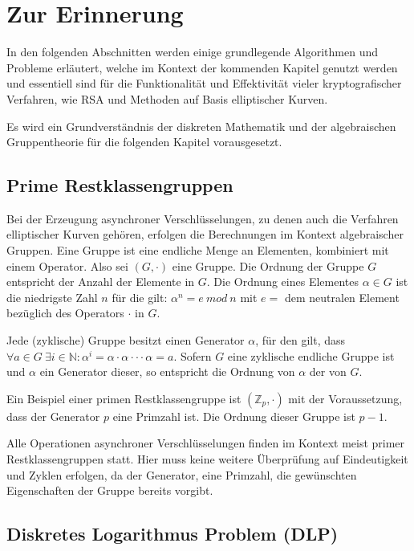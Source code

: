 \chapter{Zur Erinnerung}

In den folgenden Abschnitten werden einige grundlegende Algorithmen und Probleme erläutert, welche im Kontext der kommenden 
Kapitel genutzt werden und essentiell sind für die Funktionalität und Effektivität vieler kryptografischer Verfahren, wie RSA und Methoden 
auf Basis elliptischer Kurven.

Es wird ein Grundverständnis der diskreten Mathematik und der algebraischen Gruppentheorie für die folgenden Kapitel vorausgesetzt.

\section{Prime Restklassengruppen}

Bei der Erzeugung asynchroner Verschlüsselungen, zu denen auch die Verfahren elliptischer Kurven gehören, 
erfolgen die Berechnungen im Kontext algebraischer Gruppen.
Eine Gruppe ist eine endliche Menge an Elementen, kombiniert mit einem Operator. Also sei $(G,\cdotp)$ eine Gruppe.
Die Ordnung der Gruppe $G$ entspricht der Anzahl der Elemente in $G$. Die Ordnung eines Elementes $\alpha \in G$ ist 
die niedrigste Zahl $n$ für die gilt: $\alpha^n = e\ mod\ n$ mit $e =$ dem neutralen Element bezüglich des Operators $\cdotp$ in $G$.

Jede (zyklische) Gruppe besitzt einen Generator $\alpha$, für den gilt, dass $\forall a \in G \ \exists i \in  \mathbb{N}: \alpha^i = \alpha \cdotp \alpha \cdotp \cdotp \cdotp \alpha = a $. Sofern $G$ eine zyklische endliche Gruppe ist und $\alpha$ ein Generator dieser, so entspricht die Ordnung von $\alpha$ der von $G$.

Ein Beispiel einer primen Restklassengruppe ist $(\mathbb{Z}_p,\cdotp)$ mit der Voraussetzung, dass der Generator $p$ eine Primzahl ist. Die Ordnung dieser Gruppe ist $p-1$.

Alle Operationen asynchroner Verschlüsselungen finden im Kontext meist primer Restklassengruppen statt. Hier 
muss keine weitere Überprüfung auf Eindeutigkeit und Zyklen erfolgen, da der Generator, eine Primzahl, die gewünschten
Eigenschaften der Gruppe bereits vorgibt.

\section{Diskretes Logarithmus Problem (DLP)} \label{DLP}

